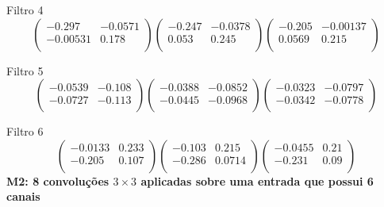 Filtro 4
{ \small
\[
\begin{pmatrix}
  -0.297 & -0.0571 \\
  -0.00531 & 0.178 \\
\end{pmatrix}
\begin{pmatrix}
  -0.247 & -0.0378 \\
  0.053 & 0.245 \\
\end{pmatrix}
\begin{pmatrix}
  -0.205 & -0.00137 \\
  0.0569 & 0.215 \\
\end{pmatrix}
\]
}

Filtro 5
{ \small
\[
\begin{pmatrix}
  -0.0539 & -0.108 \\
  -0.0727 & -0.113 \\
\end{pmatrix}
\begin{pmatrix}
  -0.0388 & -0.0852 \\
  -0.0445 & -0.0968 \\
\end{pmatrix}
\begin{pmatrix}
  -0.0323 & -0.0797 \\
  -0.0342 & -0.0778 \\
\end{pmatrix}
\]
}

Filtro 6
{ \small
\[
\begin{pmatrix}
  -0.0133 & 0.233 \\
  -0.205 & 0.107 \\
\end{pmatrix}
\begin{pmatrix}
  -0.103 & 0.215 \\
  -0.286 & 0.0714 \\
\end{pmatrix}
\begin{pmatrix}
  -0.0455 & 0.21 \\
  -0.231 & 0.09 \\
\end{pmatrix}
\]
}
\textbf{M2: 8 convoluções $3 \times 3$ aplicadas sobre uma entrada que 
possui 6 canais}

